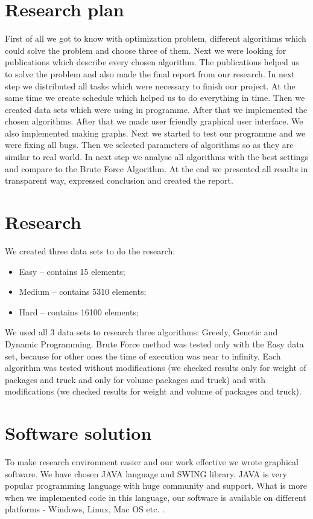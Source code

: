 \documentclass[conference,compsoc]{IEEEtran}
\begin{document}
\section{Research plan}
First of all we got to know with optimization problem, different algorithms which could solve the problem and choose three of them. Next we were looking for publications which describe every chosen algorithm. The publications helped us to solve the problem and also made the final report from our research. In next step we distributed all tasks which were necessary to finish our project. At the same time we create schedule which helped us to do everything in time. Then we created data sets which were using in programme. After that we implemented the chosen algorithms. After that we made user friendly graphical user interface. We also implemented making graphs. Next we started to test our programme and we were fixing all bugs. Then we selected parameters of algorithms so as they are similar to real world. In next step we analyse all algorithms with the best settings and compare to the Brute Force Algorithm. At the end we presented all results in transparent way, expressed conclusion and created the report.

\section{Research}
We created three data sets to do the research:
\begin{itemize}
\item Easy – contains 15 elements;
\item Medium – contains 5310 elements;
\item Hard – contains 16100 elements;
\end{itemize}
We used all 3 data sets to research three algorithms: Greedy, Genetic and Dynamic Programming.
Brute Force method was tested only with the Easy data set, because for other ones the time of execution was near to infinity.
Each algorithm was tested without modifications (we checked results only for weight of packages and truck and only for volume packages and truck) and with modifications (we checked results for weight and volume of packages and truck).

\section{Software solution}

To make research environment easier and our work effective we wrote graphical software. We have chosen JAVA language and SWING library. JAVA is very popular programming language with huge community and support. What is more when we implemented code in this language, our software is available on different platforms - Windows, Linux, Mac OS etc. .
\end{document}
